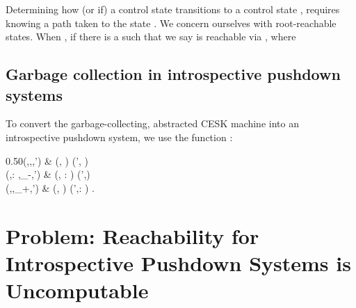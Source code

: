 Determining how (or if) a control state 
transitions to a control state , requires knowing a
path taken to the state .
We concern ourselves with root-reachable states.
When ,
if there is a  such that  we say  is reachable via , where



\subsection{Garbage collection in introspective pushdown systems}

To convert the garbage-collecting,
abstracted CESK machine into an introspective pushdown system,
we use the function :
\begin{center}
   {0.50}{(\qstate,\acont,\epsilon,\qstate')
\in \transfunction &  \aCollect(\qstate, \acont) \aTo
    (\qstate', \acont)
\\
(\qstate,\aphrame : \acont,\aphrame_{-},\qstate') \in
    \transfunction &  \aCollect(\qstate, \aphrame :
    \acont) \aTo (\qstate',\acont)
\\
    (\qstate,\acont,\aphrame_{+},\qstate')
\in \transfunction &  \aCollect(\qstate, \acont) \aTo
    (\qstate',\aphrame : \acont)
\text.}
\end{center}


\section{Problem: Reachability for Introspective Pushdown Systems is Uncomputable}
\label{sec:ipds-incomputable}

